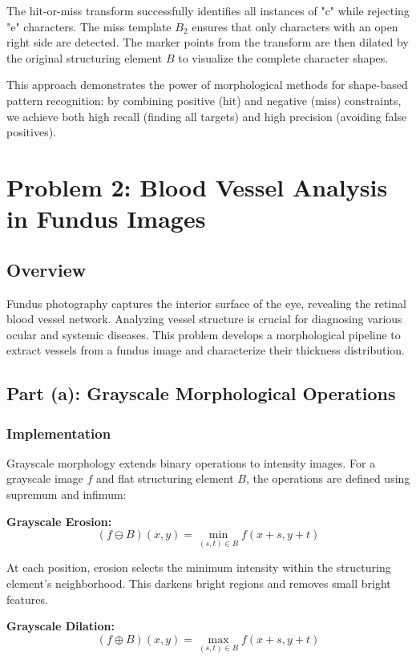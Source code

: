 \documentclass[11pt,a4paper]{article}
\begin{document}
The hit-or-miss transform successfully identifies all instances of "c" while rejecting "e" characters. The miss template $B_2$ ensures that only characters with an open right side are detected. The marker points from the transform are then dilated by the original structuring element $B$ to visualize the complete character shapes.

This approach demonstrates the power of morphological methods for shape-based pattern recognition: by combining positive (hit) and negative (miss) constraints, we achieve both high recall (finding all targets) and high precision (avoiding false positives).

\newpage
\section{Problem 2: Blood Vessel Analysis in Fundus Images}

\subsection{Overview}
Fundus photography captures the interior surface of the eye, revealing the retinal blood vessel network. Analyzing vessel structure is crucial for diagnosing various ocular and systemic diseases. This problem develops a morphological pipeline to extract vessels from a fundus image and characterize their thickness distribution.

\subsection{Part (a): Grayscale Morphological Operations}

\subsubsection{Implementation}
Grayscale morphology extends binary operations to intensity images. For a grayscale image $f$ and flat structuring element $B$, the operations are defined using supremum and infimum:

\textbf{Grayscale Erosion:}
$$(f \ominus B)(x,y) = \min_{(s,t) \in B} f(x+s, y+t)$$

At each position, erosion selects the minimum intensity within the structuring element's neighborhood. This darkens bright regions and removes small bright features.

\textbf{Grayscale Dilation:}
$$(f \oplus B)(x,y) = \max_{(s,t) \in B} f(x+s, y+t)$$
\end{document}
